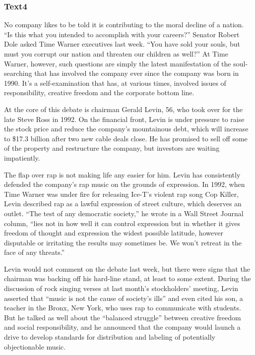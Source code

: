 \documentclass[a4paper]{article}
\begin{document}
\subsubsection{Text4}

\par
No company likes to be told it is contributing to the moral decline of a nation. “Is this what you intended to accomplish with your careers?” Senator Robert Dole asked Time Warner executives last week. “You have sold your souls, but must you corrupt our nation and threaten our children as well?” At Time Warner, however, such questions are simply the latest manifestation of the soul-searching that has involved the company ever since the company was born in 1990. It’s a self-examination that has, at various times, involved issues of responsibility, creative freedom and the corporate bottom line.

\par
At the core of this debate is chairman Gerald Levin, 56, who took over for the late Steve Ross in 1992. On the financial front, Levin is under pressure to raise the stock price and reduce the company’s mountainous debt, which will increase to \$17.3 billion after two new cable deals close. He has promised to sell off some of the property and restructure the company, but investors are waiting impatiently.

\par
The flap over rap is not making life any easier for him. Levin has consistently defended the company’s rap music on the grounds of expression. In 1992, when Time Warner was under fire for releasing Ice-T’s violent rap song Cop Killer, Levin described rap as a lawful expression of street culture, which deserves an outlet. “The test of any democratic society,” he wrote in a Wall Street Journal column, “lies not in how well it can control expression but in whether it gives freedom of thought and expression the widest possible latitude, however disputable or irritating the results may sometimes be. We won’t retreat in the face of any threats.”

\par
Levin would not comment on the debate last week, but there were signs that the chairman was backing off his hard-line stand, at least to some extent. During the discussion of rock singing verses at last month’s stockholders’ meeting, Levin asserted that “music is not the cause of society’s ills” and even cited his son, a teacher in the Bronx, New York, who uses rap to communicate with students. But he talked as well about the “balanced struggle” between creative freedom and social responsibility, and he announced that the company would launch a drive to develop standards for distribution and labeling of potentially objectionable music.
\end{document}
